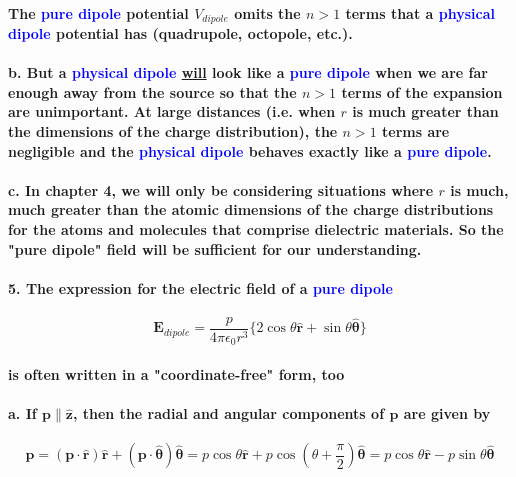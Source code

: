\documentclass{article}
\begin{document}
\paragraph{The \textcolor{blue}{pure dipole} potential $V_{dipole}$ omits the $n>1$ terms that a \textcolor{blue}{physical dipole} potential has (quadrupole, octopole, etc.).}
\paragraph{\indent b. But a \textcolor{blue}{physical dipole} \underline{will} look like a \textcolor{blue}{pure dipole} when we are far enough away from the source so that the $n>1$ terms of the expansion are unimportant. At large distances (i.e. when $r$ is much greater than the dimensions of the charge distribution), the $n>1$ terms are negligible and the \textcolor{blue}{physical dipole} behaves exactly like a \textcolor{blue}{pure dipole}.}
\paragraph{\indent c. In chapter 4, we will only be considering situations where $r$ is much, much greater than the atomic dimensions of the charge distributions for the atoms and molecules that comprise dielectric materials. So the "pure dipole" field will be sufficient for our understanding.}
\paragraph{5. The expression for the electric field of a \textcolor{blue}{pure dipole}}
\begin{equation*}
    \boldsymbol{E}_{dipole}=\frac{p}{4\pi\epsilon_0r^3}\{ 2\cos\theta\hat{\boldsymbol{r}}+\sin\theta\hat{\boldsymbol{\theta}}\}
\end{equation*}
\paragraph{is often written in a "coordinate-free" form, too}
\paragraph{\indent a. If $\boldsymbol{p}\parallel\hat{\boldsymbol{z}}$, then the radial and angular components of $\boldsymbol{p}$ are given by}
\begin{equation*}
    \boldsymbol{p}=(\boldsymbol{p\cdot \hat{r}})\hat{\boldsymbol{r}}+(\boldsymbol{p\cdot \hat{\theta}})\hat{\boldsymbol{\theta}}=p\cos\theta\hat{\boldsymbol{r}}+p\cos(\theta+\frac{\pi}{2})\hat{\boldsymbol{\theta}}=p\cos\theta\hat{\boldsymbol{r}}-p\sin\theta\hat{\boldsymbol{\theta}}
\end{equation*}
\end{document}
